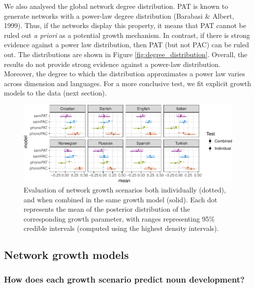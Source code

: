 \documentclass[10pt, letterpaper]{article}
\newenvironment{CodeChunk}{}{}
\begin{document}
We also analysed the global network degree distribution. PAT is known to
generate networks with a power-law degree distribution (Barabasi \&
Albert, 1999). Thus, if the networks display this property, it means
that PAT cannot be ruled out \emph{a priori} as a potential growth
mechanism. In contrast, if there is strong evidence against a power law
distribution, then PAT (but not PAC) can be ruled out. The distributions
are shown in Figure \ref{fig:degree_distribution}. Overall, the results
do not provide strong evidence against a power-law distribution.
Moreover, the degree to which the distribution approximates a power law
varies across dimension and languages. For a more conclusive test, we
fit explicit growth models to the data (next section).

\begin{CodeChunk}
\begin{figure}[h]

{\centering \includegraphics{figs/pred_ind_img-1} 

}

\caption{\label{fig:pred_ind}Evaluation of network growth scenarios both individually (dotted), and when combined in the same growth model (solid). Each dot represents the mean of the posterior distribution of the corresponding growth parameter, with ranges representing 95\% credible intervals (computed using the highest density intervals).}\label{fig:pred_ind_img}
\end{figure}
\end{CodeChunk}

\subsection{Network growth models}\label{network-growth-models}

\subsubsection{How does each growth scenario predict noun
development?}\label{how-does-each-growth-scenario-predict-noun-development}
\end{document}
